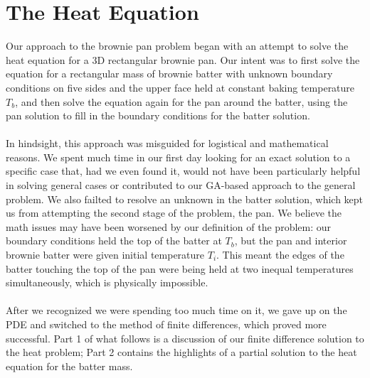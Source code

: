 \documentclass[12pt]{reedmcm}
\begin{document}
\section{The Heat Equation}
Our approach to the brownie pan problem began with an attempt to solve the heat equation for a 3D rectangular brownie pan.  Our intent was to first solve the equation for a rectangular mass of brownie batter with unknown boundary conditions on five sides and the upper face held at constant baking temperature $T_b$, and then solve the equation again for the pan around the batter, using the pan solution to fill in the boundary conditions for the batter solution.\\
\\
In hindsight, this approach was misguided for logistical and mathematical reasons.  We spent much time in our first day looking for an exact solution to a specific case that, had we even found it, would not have been particularly helpful in solving general cases or contributed to our GA-based approach to the general problem.  We also failted to resolve an unknown in the batter solution, which kept us from attempting the second stage of the problem, the pan.  We believe the math issues may have been worsened by our definition of the problem: our boundary conditions held the top of the batter at $T_b$, but the pan and interior brownie batter were given initial temperature $T_i$.  This meant the edges of the batter touching the top of the pan were being held at two inequal temperatures simultaneously, which is physically impossible.\\
\\
After we recognized we were spending too much time on it, we gave up on the PDE and switched to the method of finite differences, which proved more successful.  Part 1 of what follows is a discussion of our finite difference solution to the heat problem; Part 2 contains the highlights of a partial solution to the heat equation for the batter mass.\\
\end{document}
